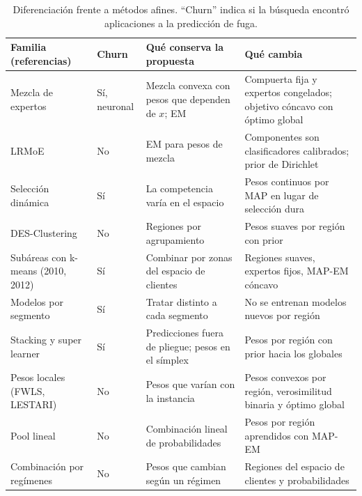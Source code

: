 \documentclass[11pt,a4paper]{article}
\begin{document}
\begin{table}[t]
\centering
\caption{Diferenciación frente a métodos afines. ``Churn'' indica si la búsqueda encontró aplicaciones a la predicción de fuga.}
\label{tab:afines}
\footnotesize
\begin{tabularx}{\textwidth}{>{\raggedright\arraybackslash}p{3.2cm}>{\raggedright\arraybackslash}p{1.15cm}>{\raggedright\arraybackslash}X>{\raggedright\arraybackslash}X}
\toprule
Familia (referencias) & Churn & Qué conserva la propuesta & Qué cambia \\
\midrule
Mezcla de expertos \cite{jordan1994,yan2001} & Sí, neuronal & Mezcla convexa con pesos que dependen de $x$; EM & Compuerta fija y expertos congelados; objetivo cóncavo con óptimo global \\
LRMoE \cite{fung2019} & No & EM para pesos de mezcla & Componentes son clasificadores calibrados; prior de Dirichlet \\
Selección dinámica \cite{ko2008,cruz2018,xiao2012} & Sí & La competencia varía en el espacio & Pesos continuos por MAP en lugar de selección dura \\
DES-Clustering \cite{soares2006} & No & Regiones por agrupamiento & Pesos suaves por región con prior \\
Subáreas con k-means (2010, 2012) \cite{xia2010,xia2012} & Sí & Combinar por zonas del espacio de clientes & Regiones suaves, expertos fijos, MAP-EM cóncavo \\
Modelos por segmento \cite{decaigny2018,decaigny2021} & Sí & Tratar distinto a cada segmento & No se entrenan modelos nuevos por región \\
Stacking y super learner \cite{wolpert1992,vanderlaan2007} & Sí & Predicciones fuera de pliegue; pesos en el símplex & Pesos por región con prior hacia los globales \\
Pesos locales (FWLS, LESTARI) \cite{sill2009,arifin2025} & No & Pesos que varían con la instancia & Pesos convexos por región, verosimilitud binaria y óptimo global \\
Pool lineal \cite{ranjan2010} & No & Combinación lineal de probabilidades & Pesos por región aprendidos con MAP-EM \\
Combinación por regímenes \cite{elliott2005} & No & Pesos que cambian según un régimen & Regiones del espacio de clientes y probabilidades \\
\bottomrule
\end{tabularx}
\end{table}
\end{document}

